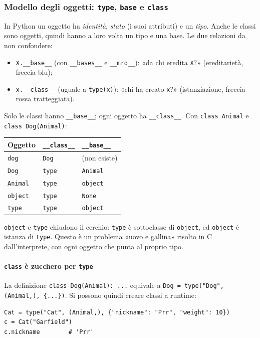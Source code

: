 \documentclass[a4paper,12pt]{article}
\begin{document}
\subsubsection{Modello degli oggetti: \texttt{type}, \texttt{base} e \texttt{class}}
In Python un oggetto ha \emph{identità}, \emph{stato} (i suoi attributi) e un \emph{tipo}.
Anche le classi sono oggetti, quindi hanno a loro volta un tipo e una base. Le due relazioni
da non confondere:
\begin{itemize}[nosep]
  \item \texttt{X.\_\_base\_\_} (con \texttt{\_\_bases\_\_} e \texttt{\_\_mro\_\_}): «da chi
        eredita \texttt{X}?» (ereditarietà, freccia blu);
  \item \texttt{x.\_\_class\_\_} (uguale a \texttt{type(x)}): «chi ha creato \texttt{x}?»
        (istanziazione, freccia rossa tratteggiata).
\end{itemize}
Solo le classi hanno \texttt{\_\_base\_\_}; ogni oggetto ha \texttt{\_\_class\_\_}. Con
\texttt{class Animal} e \texttt{class Dog(Animal)}:
\begin{center}
\begin{tabular}{|l|l|l|}
\hline
Oggetto & \texttt{\_\_class\_\_} & \texttt{\_\_base\_\_} \\
\hline
\texttt{dog} & \texttt{Dog} & (non esiste) \\
\texttt{Dog} & \texttt{type} & \texttt{Animal} \\
\texttt{Animal} & \texttt{type} & \texttt{object} \\
\texttt{object} & \texttt{type} & \texttt{None} \\
\texttt{type} & \texttt{type} & \texttt{object} \\
\hline
\end{tabular}
\end{center}
\texttt{object} e \texttt{type} chiudono il cerchio: \texttt{type} è sottoclasse di
\texttt{object}, ed \texttt{object} è istanza di \texttt{type}. Questo è un problema
«uovo e gallina» risolto in C dall'interprete, con ogni oggetto che punta al proprio tipo.

\paragraph{\texttt{class} è zucchero per \texttt{type}} La definizione
\texttt{class Dog(Animal): ...} equivale a \texttt{Dog = type("Dog", (Animal,), \{...\})}.
Si possono quindi creare classi a runtime:
\begin{verbatim}
Cat = type("Cat", (Animal,), {"nickname": "Prr", "weight": 10})
c = Cat("Garfield")
c.nickname        # 'Prr'
\end{verbatim}
\end{document}
